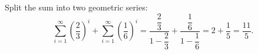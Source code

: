 Split the sum into two geometric series:
\[
\sum_{i=1}^{\infty}\left(\dfrac{2}{3}\right)^i+\sum_{i=1}^{\infty}\left(\dfrac{1}{6}\right)^i=\dfrac{\dfrac{2}{3}}{1-\dfrac{2}{3}}+\dfrac{\dfrac{1}{6}}{1-\dfrac{1}{6}}=2+\dfrac{1}{5}=\boxed{\dfrac{11}{5}}.
\]
